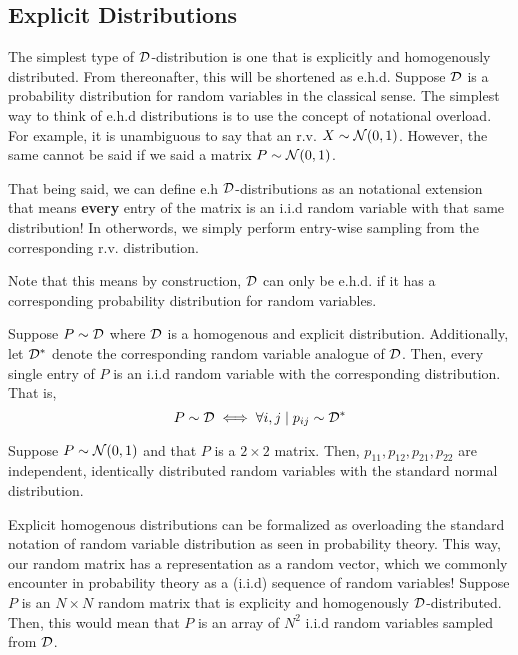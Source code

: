 
\subsection{Explicit Distributions}


The simplest type of $\mathcal{D}$-distribution is one that is explicitly and homogenously distributed. From thereonafter, this will be shortened as e.h.d.
Suppose $\mathcal{D}$ is a probability distribution for random variables in the classical sense. The simplest way to think of e.h.d distributions is to use the concept of notational overload.
For example, it is unambiguous to say that an r.v. $X \sim \mathcal{N}(0,1)$. However, the same cannot be said if we said a matrix $P \sim \mathcal{N}(0,1)$.

That being said, we can define e.h $\mathcal{D}$-distributions as an notational extension that means \textbf{every} entry of the matrix is an i.i.d random variable with that same distribution!
In otherwords, we simply perform entry-wise sampling from the corresponding r.v. distribution.

Note that this means by construction, $\mathcal{D}$ can only be e.h.d. if it has a corresponding probability distribution for random variables.

\begin{definition}
Suppose $P \sim \mathcal{D}$ where $\mathcal{D}$ is a homogenous and explicit distribution. Additionally, let $\mathcal{D}^*$ denote the corresponding random variable analogue of $\mathcal{D}$.
Then, every single entry of $P$ is an i.i.d random variable with the corresponding distribution. That is,
$$ P \sim \mathcal{D} \iff \forall i,j \mid p_{ij} \sim \mathcal{D}^* $$
\end{definition}

\begin{example}
Suppose $P \sim \mathcal{N}(0,1)$ and that $P$ is a $2 \times 2$ matrix.
Then, $p_{11}, p_{12}, p_{21}, p_{22}$ are independent, identically distributed random variables with the standard normal distribution.
\end{example}

\ALGexplicit

\begin{formalization}
Explicit homogenous distributions can be formalized as overloading the standard notation of random variable distribution as seen in probability theory.
This way, our random matrix has a representation as a random vector, which we commonly encounter in probability theory as a (i.i.d) sequence of random variables!
Suppose $P$ is an $N \times N$ random matrix that is explicity and homogenously $\mathcal{D}$-distributed. Then, this would mean that $P$ is an array of $N^2$ i.i.d random variables sampled from $\mathcal{D}$.
\end{formalization}

